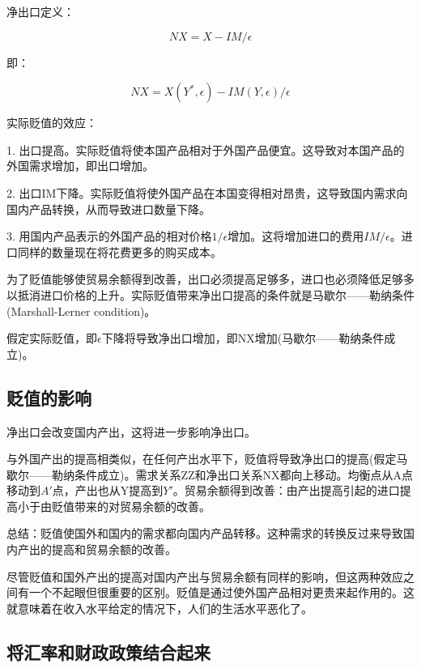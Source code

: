 \documentclass{article}
\begin{document}
净出口定义：

\[
NX=X-IM/\epsilon
\]

即：

\[
NX=X(Y^*,\epsilon)-IM(Y,\epsilon)/\epsilon
\]

实际贬值的效应：

1. 出口提高。实际贬值将使本国产品相对于外国产品便宜。这导致对本国产品的外国需求增加，即出口增加。

2. 出口IM下降。实际贬值将使外国产品在本国变得相对昂贵，这导致国内需求向国内产品转换，从而导致进口数量下降。

3. 用国内产品表示的外国产品的相对价格$ 1/\epsilon $增加。这将增加进口的费用$ IM/\epsilon $。进口同样的数量现在将花费更多的购买成本。

为了贬值能够使贸易余额得到改善，出口必须提高足够多，进口也必须降低足够多以抵消进口价格的上升。实际贬值带来净出口提高的条件就是马歇尔——勒纳条件(Marshall-Lerner condition)。

假定实际贬值，即$ \epsilon $下降将导致净出口增加，即NX增加(马歇尔——勒纳条件成立)。

\subsection{贬值的影响}

净出口会改变国内产出，这将进一步影响净出口。

与外国产出的提高相类似，在任何产出水平下，贬值将导致净出口的提高(假定马歇尔——勒纳条件成立)。需求关系ZZ和净出口关系NX都向上移动。均衡点从A点移动到$ A' $点，产出也从Y提高到$ Y' $。贸易余额得到改善：由产出提高引起的进口提高小于由贬值带来的对贸易余额的改善。

总结：贬值使国外和国内的需求都向国内产品转移。这种需求的转换反过来导致国内产出的提高和贸易余额的改善。

尽管贬值和国外产出的提高对国内产出与贸易余额有同样的影响，但这两种效应之间有一个不起眼但很重要的区别。贬值是通过使外国产品相对更贵来起作用的。这就意味着在收入水平给定的情况下，人们的生活水平恶化了。

\subsection{将汇率和财政政策结合起来}
\end{document}

